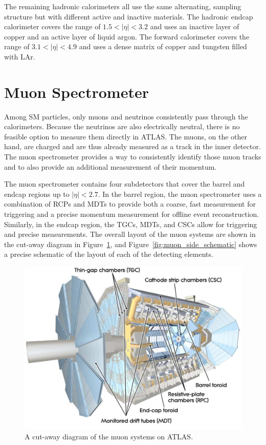 The remaining hadronic calorimeters all use the same alternating, sampling structure but with different active and inactive materials.
The hadronic endcap calorimeter covers the range of $1.5 < |\eta| < 3.2$ and uses an inactive layer of copper and an active layer of \acl{liquid argon}.
The forward calorimeter covers the range of $3.1 < |\eta| < 4.9$ and uses a dense matrix of copper and tungsten filled with \acl{LAr}. 


\section{Muon Spectrometer}

Among \ac{SM} particles, only muons and neutrinos consistently pass through the calorimeters.
Because the neutrinos are also electrically neutral, there is no feasible option to measure them directly in \ac{ATLAS}.
The muons, on the other hand, are charged and are thus already measured as a track in the inner detector.
The muon spectrometer provides a way to consistently identify those muon tracks and to also provide an additional measurement of their momentum.

The muon spectrometer contains four subdetectors that cover the barrel and endcap regions up to $|\eta| < 2.7$.
In the barrel region, the muon spectrometer uses a combination of \acp{RCP} and \acp{MDT} to provide both a coarse, fast measurement for triggering and a precise momentum measurement for offline event reconstruction.
Similarly, in the endcap region, the \acp{TGC}, \acp{MDT}, and \acp{CSC} allow for triggering and precise measurements.
The overall layout of the muon systems are shown in the cut-away diagram in Figure~\ref{fig:muon_overview}, and Figure~\ref{fig:muon_side_schematic} shows a precise schematic of the layout of each of the detecting elements.


\begin{figure}[hbtp]
\includegraphics[width=\fullfig]{figures/muon_overview.pdf}
\caption{A cut-away diagram of the muon systems on \ac{ATLAS}.}
\label{fig:muon_overview}
\end{figure}

